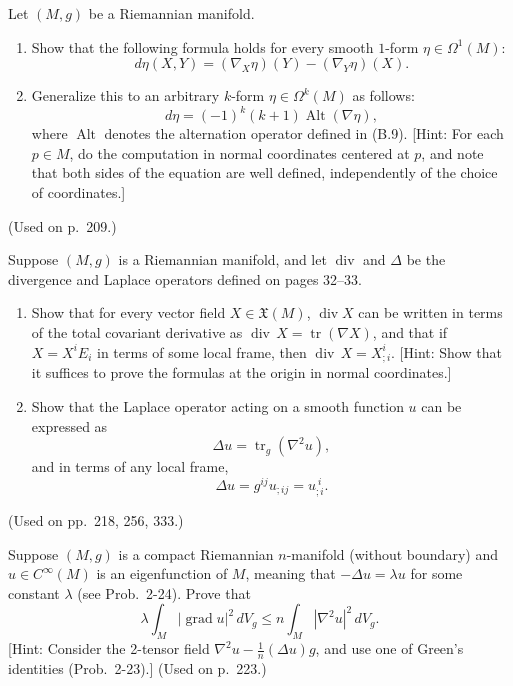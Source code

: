 \begin{exercise}
\label{prob:exterior-derivative-covariant-formula}

Let $(M,g)$ be a Riemannian manifold.
\begin{enumerate}
\item[(a)] Show that the following formula holds for every smooth $1$-form $\eta \in \Omega^1(M)$:
\[
d\eta(X,Y) = (\nabla_X \eta)(Y) - (\nabla_Y \eta)(X).
\]
\item[(b)] Generalize this to an arbitrary $k$-form $\eta \in \Omega^k(M)$ as follows:
\[
d\eta = (-1)^k(k+1)\operatorname{Alt}(\nabla\eta),
\]
where $\operatorname{Alt}$ denotes the alternation operator defined in (B.9). [Hint: For each $p \in M$, do the computation in normal coordinates centered at $p$, and note that both sides of the equation are well defined, independently of the choice of coordinates.]
\end{enumerate}
(Used on p.\ 209.)
\end{exercise}

\begin{exercise}
\label{prob:divergence-laplacian-formulas}

Suppose $(M,g)$ is a Riemannian manifold, and let $\operatorname{div}$ and $\Delta$ be the divergence and Laplace operators defined on pages 32--33.
\begin{enumerate}
\item[(a)] Show that for every vector field $X \in \mathfrak{X}(M)$, $\operatorname{div} X$ can be written in terms of the total covariant derivative as $\operatorname{div}\, X = \operatorname{tr}(\nabla X)$, and that if $X = X^i E_i$ in terms of some local frame, then $\operatorname{div}\, X = X^i_{;i}$. [Hint: Show that it suffices to prove the formulas at the origin in normal coordinates.]
\item[(b)] Show that the Laplace operator acting on a smooth function $u$ can be expressed as
\[
\Delta u = \operatorname{tr}_g(\nabla^2 u),
\]
and in terms of any local frame,
\[
\Delta u = g^{ij}u_{;ij} = u_{;i}^{\ i}.
\]
\end{enumerate}
(Used on pp.\ 218, 256, 333.)
\end{exercise}

\begin{exercise}
\label{prob:eigenfunction-laplacian-inequality}

Suppose $(M, g)$ is a compact Riemannian $n$-manifold (without boundary) and $u \in C^\infty(M)$ is an eigenfunction of $M$, meaning that $-\Delta u = \lambda u$ for some constant $\lambda$ (see Prob.\ 2-24). Prove that
\[
\lambda \int_M |\operatorname{grad} u|^2 \, dV_g \le n \int_M |\nabla^2 u|^2 \, dV_g.
\]
[Hint: Consider the 2-tensor field $\nabla^2 u - \frac{1}{n}(\Delta u)g$, and use one of Green's identities (Prob.\ 2-23).] (Used on p.\ 223.)
\end{exercise}

